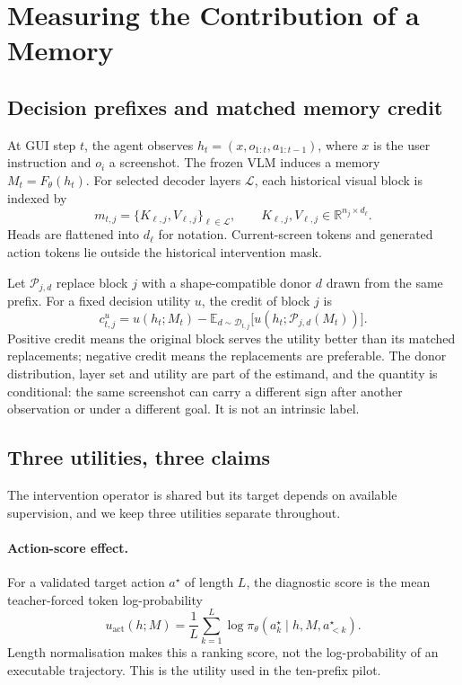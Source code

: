 \documentclass{article}
\newcommand{\E}{\mathbb{E}}
\newcommand{\R}{\mathbb{R}}
\begin{document}
\section{Measuring the Contribution of a Memory}
\label{sec:method}

\subsection{Decision prefixes and matched memory credit}

At GUI step $t$, the agent observes $h_t=(x,o_{1:t},a_{1:t-1})$, where $x$ is
the user instruction and $o_i$ a screenshot. The frozen VLM induces a memory
$M_t=F_\theta(h_t)$. For selected decoder layers $\mathcal L$, each historical
visual block is indexed by
\begin{equation}
 m_{t,j}=\{K_{\ell,j},V_{\ell,j}\}_{\ell\in\mathcal L},
 \qquad K_{\ell,j},V_{\ell,j}\in\R^{n_j\times d_\ell}.
 \label{eq:memory}
\end{equation}
Heads are flattened into $d_\ell$ for notation. Current-screen tokens and
generated action tokens lie outside the historical intervention mask.

Let $\mathcal P_{j,d}$ replace block $j$ with a shape-compatible donor $d$ drawn
from the same prefix. For a fixed decision utility $u$, the credit of block $j$
is
\begin{equation}
 c^u_{t,j}=u(h_t;M_t)-\E_{d\sim\mathcal D_{t,j}}
       \big[u(h_t;\mathcal P_{j,d}(M_t))\big].
 \label{eq:credit}
\end{equation}
Positive credit means the original block serves the utility better than its
matched replacements; negative credit means the replacements are preferable. The
donor distribution, layer set and utility are part of the estimand, and the
quantity is conditional: the same screenshot can carry a different sign after
another observation or under a different goal. It is not an intrinsic label.

\subsection{Three utilities, three claims}

The intervention operator is shared but its target depends on available
supervision, and we keep three utilities separate throughout.

\paragraph{Action-score effect.} For a validated target action $a^\star$ of
length $L$, the diagnostic score is the mean teacher-forced token
log-probability
\begin{equation}
 u_{\mathrm{act}}(h;M)=\frac{1}{L}\sum_{k=1}^{L}
 \log\pi_\theta(a_k^\star\mid h,M,a_{<k}^\star).
 \label{eq:act}
\end{equation}
Length normalisation makes this a ranking score, not the log-probability of an
executable trajectory. This is the utility used in the ten-prefix pilot.
\end{document}
